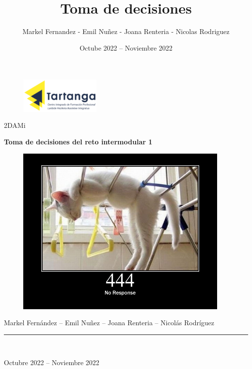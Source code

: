 \documentclass[a4paper]{article}
\title{Toma de decisiones}
\author{Markel Fernandez - Emil Nuñez - Joana Renteria - Nicolas Rodriguez}
\date{Octube 2022 -- Noviembre 2022}
\begin{document}
	\begin{titlepage}
    	\begin{center}
    		\begin{figure}[htb]
    			\begin{center}
    				\includegraphics[width=4cm]{imgs/title/logo.png}
    			\end{center}
    		\end{figure}
    		
    		\vspace*{0.25in}
    		2DAMi
    		\vspace*{0.3in}
    		
    		\begin{Large}
        		\huge{\textbf{Toma de decisiones del reto intermodular 1}} \\
    		\end{Large}
    		
    		\vspace*{0.4in}
    		\begin{figure}[h!]
        		\centering
        		\includegraphics[width=300pt]{imgs/title/portada.jpg}
        		\label{titulo}
    		\end{figure}
    		
    		\begin{large}
				Markel Fernández -- Emil Nuñez -- Joana Renteria -- Nicolás Rodríguez
    		\end{large}
    		
    		\vspace*{0.4in}
    		\rule{90mm}{0.1mm}\\
    		\vspace*{0.1in}
    		\begin{large}
        		Octubre 2022 -- Noviembre 2022\\
    		\end{large}
    	
    	\end{center}
	\end{titlepage}
\end{document}
